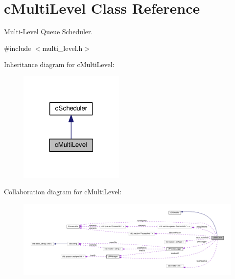 \hypertarget{classcMultiLevel}{\section{c\-Multi\-Level \-Class \-Reference}
\label{de/d3b/classcMultiLevel}
}


\-Multi-\/\-Level \-Queue \-Scheduler.  




{\ttfamily \#include $<$multi\-\_\-level.\-h$>$}



\-Inheritance diagram for c\-Multi\-Level\-:\nopagebreak
\begin{figure}[H]
\begin{center}
\leavevmode
\includegraphics[width=146pt]{dd/d50/classcMultiLevel__inherit__graph}
\end{center}
\end{figure}


\-Collaboration diagram for c\-Multi\-Level\-:\nopagebreak
\begin{figure}[H]
\begin{center}
\leavevmode
\includegraphics[width=350pt]{df/d50/classcMultiLevel__coll__graph}
\end{center}
\end{figure}
